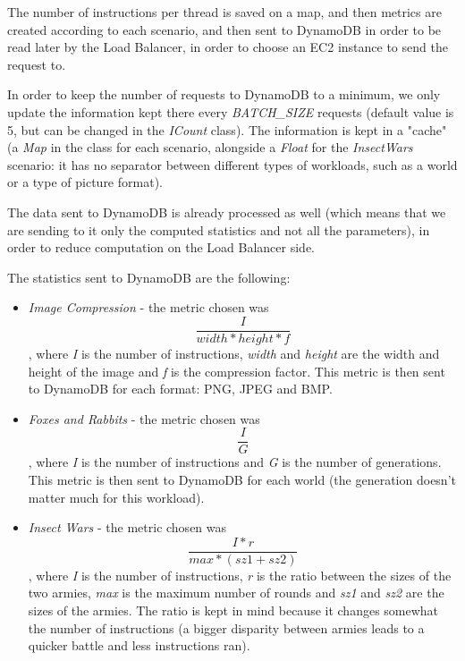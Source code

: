 \documentclass{article}
\begin{document}
The number of instructions per thread is saved on a map, and then metrics are
created according to each scenario, and then sent to DynamoDB in order to be
read later by the Load Balancer, in order to choose an EC2 instance to send the
request to.

In order to keep the number of requests to DynamoDB to a minimum, we only
update the information kept there every \textit{BATCH\_SIZE} requests (default
value is 5, but can be changed in the \textit{ICount} class). The information is
kept in a "cache" (a \textit{Map} in the class for each scenario, alongside a
\textit{Float} for the \textit{InsectWars} scenario: it has no separator between
different types of workloads, such as a world or a type of picture format).

The data sent to DynamoDB is already processed as well (which means that we are
sending to it only the computed statistics and not all the parameters), in order
to reduce computation on the Load Balancer side.

The statistics sent to DynamoDB are the following:

\begin{itemize}
    \item \textit{Image Compression} - the metric chosen was
        \[\frac{I}{width*height*f}\], where \textit{I} is the number of
        instructions, \textit{width} and \textit{height} are the width and
        height of the image and \textit{f} is the compression factor. This
        metric is then sent to DynamoDB for each format: PNG, JPEG and BMP. 
    \item \textit{Foxes and Rabbits} - the metric chosen was \[\frac{I}{G}\], 
        where \textit{I} is the number of instructions and \textit{G} is the
        number of generations. This metric is then sent to DynamoDB for each
        world (the generation doesn't matter much for this workload).
    \item \textit{Insect Wars} - the metric chosen was
        \[\frac{I*r}{max*(sz1+sz2)}\], where \textit{I} is the number of
        instructions, \textit{r} is the ratio between the sizes of the two
        armies, \textit{max} is the maximum number of rounds and \textit{sz1}
        and \textit{sz2} are the sizes of the armies. The ratio is kept in mind
        because it changes somewhat the number of instructions (a bigger
        disparity between armies leads to a quicker battle and less instructions
        ran).
\end{itemize}
\end{document}
